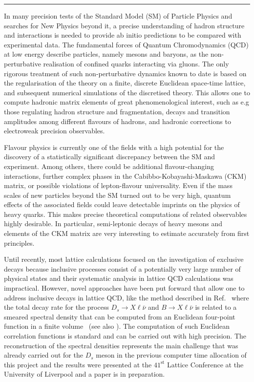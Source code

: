 \rule{\textwidth}{0.4pt}

In many precision tests of the Standard Model (SM) of Particle Physics and
searches for New Physics beyond it, a precise understanding of hadron
structure and interactions is needed to provide ab initio predictions
to be compared with experimental data. The fundamental forces of Quantum
Chromodynamics (QCD) at low energy describe particles, namely mesons and
baryons, as the non-perturbative realisation of confined quarks interacting
via gluons. The only rigorous treatment of such non-perturbative
dynamics known to date is based on the regularisation of the theory on
a finite, discrete Euclidean space-time lattice, and subsequent
numerical simulations of the discretised theory. This allows one to
compute hadronic matrix elements of great phenomenological interest,
such as e.g those regulating hadron structure and fragmentation, decays and transition
amplitudes among different flavours of hadrons, and hadronic corrections
to electroweak precision observables.

Flavour physics is currently one of the fields with a high potential
for the discovery of a statistically significant discrepancy between the SM and
experiment. Among others, there could be additional flavour-changing
interactions, further complex phases in the Cabibbo-Kobayashi-Maskawa (CKM)
matrix, or possible violations
of lepton-flavour universality. Even if the mass scales of new
particles beyond the SM turned out to be very high, quantum effects of
the associated fields could leave detectable imprints on the physics
of heavy quarks.
This makes precise theoretical computations of related observables
highly desirable. In particular, semi-leptonic decays of heavy mesons
and elements of the CKM matrix are very
interesting to estimate accurately from first principles.

Until recently, most lattice calculations focused on the investigation
of exclusive decays because inclusive processes consist
of a potentially very large number of physical states and their
systematic analysis in lattice QCD calculations was impractical.
However, novel approaches have been put forward that allow one to address
inclusive decays in lattice QCD, like the method described in
Ref.~\cite{Gambino:2020crt} where the total decay rate for the process
$D_s \to X\ell\bar\nu$ and $B \to X\ell\bar\nu$   is related to a smeared spectral
density that can be computed from an Euclidean four-point function in a finite
volume~\cite{Hansen:2019idp} (see
also \cite{Bulava:2019kbi,Bulava:2021fre,Gambino:2022dvu}). The computation of such
Euclidean correlation functions is standard and can be carried out
with high precision.
The reconstruction of the spectral densities
represents the main challenge that was already carried out for the $D_s$ meson
in the previous computer time allocation of this project and the results were
presented at the $41^{\mbox{st}}$ Lattice Conference at the University of Liverpool 
\cite{talklatt2024_ale, talklatt2024_chr}
and a paper is in preparation.

